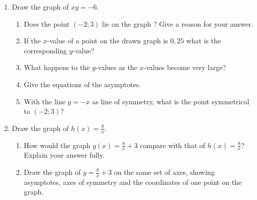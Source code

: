 \begin{exercises}{}
{
   \begin{enumerate}[noitemsep, label=\textbf{\arabic*}. ] 
\item Draw the graph of $xy=-6$.
    \begin{enumerate}[noitemsep, label=\textbf{(\alph*)} ] 
    \item Does the point $(-2; 3)$ lie on the graph ? Give a reason for your answer.
    \item If the $x$-value of a point on the drawn graph is $0,25$ what is the corresponding $y$-value?
    \item What happens to the $y$-values as the $x$-values become very large?
\item Give the equations of the asymptotes.
    \item With the line $y=-x$ as line of symmetry, what is the point symmetrical to $(-2; 3)$?
    \end{enumerate}
\item Draw the graph of $h(x)=\frac{8}{x}$.
    \begin{enumerate}[noitemsep, label=\textbf{(\alph*)} ] 
    \item How would the graph $g(x)=\frac{8}{x}+3$ compare with that of $h(x)=\frac{8}{x}$? Explain your answer fully.
    \item Draw the graph of $y=\frac{8}{x}+3$ on the same set of axes, showing asymptotes, axes of symmetry and the coordinates of one point on the graph.
    \end{enumerate}
 \end{enumerate}

}
\end{exercises}


